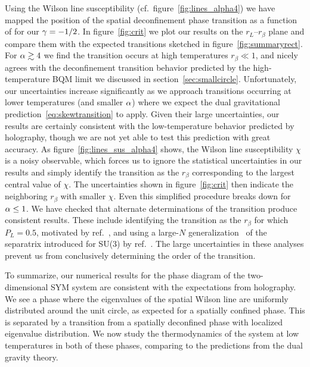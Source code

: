 Using the Wilson line susceptibility (cf.\ figure~\ref{fig:lines_alpha4}) we have mapped the position of the spatial deconfinement phase transition as a function of \al for our $\gamma = -1 / 2$.
In figure~\ref{fig:crit} we plot our results on the $r_L$--$r_{\beta}$ plane and compare them with the expected transitions sketched in figure~\ref{fig:summaryrect}.
For $\alpha \gtrsim 4$ we find the transition occurs at high temperatures $r_{\beta} \ll 1$, and nicely agrees with the deconfinement transition behavior predicted by the high-temperature BQM limit we discussed in section~\ref{sec:smallcircle}.
Unfortunately, our uncertainties increase significantly as we approach transitions occurring at lower temperatures (and smaller $\alpha$) where we expect the dual gravitational prediction~\eqref{eq:skewtransition} to apply.
Given their large uncertainties, our results are certainly consistent with the low-temperature behavior predicted by holography, though we are not yet able to test this prediction with great accuracy.
As figure~\ref{fig:lines_sus_alpha4} shows, the Wilson line susceptibility $\chi$ is a noisy observable, which forces us to ignore the statistical uncertainties in our results and simply identify the transition as the $r_{\beta}$ corresponding to the largest central value of $\chi$.
The uncertainties shown in figure~\ref{fig:crit} then indicate the neighboring $r_{\beta}$ with smaller $\chi$.
Even this simplified procedure breaks down for $\alpha \leq 1$.
We have checked that alternate determinations of the transition produce consistent results.
These include identifying the transition as the $r_{\beta}$ for which $P_L = 0.5$, motivated by ref.~\cite{Aharony:2004ig}, and using a large-$N$ generalization~\cite{Hudspith:2017BU} of the separatrix introduced for SU(3) by ref.~\cite{Francis:2015lha}.
The large uncertainties in these analyses prevent us from conclusively determining the order of the transition.

To summarize, our numerical results for the phase diagram of the two-dimensional SYM system are consistent with the expectations from holography.
We see a phase where the eigenvalues of the spatial Wilson line are uniformly distributed around the unit circle, as expected for a spatially confined phase.
This is separated by a transition from a spatially deconfined phase with localized eigenvalue distribution.
We now study the thermodynamics of the system at low temperatures in both of these phases, comparing to the predictions from the dual gravity theory.

